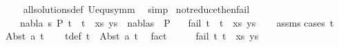 \begin{isabellebody}
\ \ \ \isamarkupfalse%
\ all{\isacharunderscore}{\kern0pt}solutions{\isacharunderscore}{\kern0pt}def\ U{\isacharunderscore}{\kern0pt}equ{\isacharunderscore}{\kern0pt}symm\ \isamarkupfalse%
\ simp\isanewline
{}\isamarkupfalse%
%
\endisatagproof
{\isafoldproof}%
%
\isadelimproof
\isanewline
%
\endisadelimproof
\isanewline
\isanewline
\isanewline
\isanewline
{}\isamarkupfalse%
\ not{\isacharunderscore}{\kern0pt}reduce{\isacharunderscore}{\kern0pt}then{\isacharunderscore}{\kern0pt}fail{\isacharcolon}{\kern0pt}\isanewline
\ \ \ {\isachardoublequoteopen}{\isasymnot}\ {\isacharparenleft}{\kern0pt}{\isasymexists}nabla\ s\ P{\isacharprime}{\kern0pt}{\isachardot}{\kern0pt}\ {\isacharparenleft}{\kern0pt}{\isacharparenleft}{\kern0pt}t{}\ {\isasymapprox}{\isacharquery}{\kern0pt}\ t{}{\isacharparenright}{\kern0pt}\ {\isacharhash}{\kern0pt}\ xs{\isacharcomma}{\kern0pt}\ ys{\isacharparenright}{\kern0pt}\ {\isasymTurnstile}\ {\isacharparenleft}{\kern0pt}nabla{\isacharcomma}{\kern0pt}s{\isacharparenright}{\kern0pt}\ {\isasymRightarrow}\ P{\isacharprime}{\kern0pt}{\isacharparenright}{\kern0pt}{\isachardoublequoteclose}\isanewline
\ \ \ {\isachardoublequoteopen}fail\ {\isacharparenleft}{\kern0pt}{\isacharparenleft}{\kern0pt}t{}\ {\isasymapprox}{\isacharquery}{\kern0pt}\ t{}{\isacharparenright}{\kern0pt}\ {\isacharhash}{\kern0pt}\ xs{\isacharcomma}{\kern0pt}\ ys{\isacharparenright}{\kern0pt}{\isachardoublequoteclose}\isanewline
%
\isadelimproof
\ \ %
\endisadelimproof
%
\isatagproof
{}\isamarkupfalse%
\ assms\isanewline
{}\isamarkupfalse%
{\isacharparenleft}{\kern0pt}cases\ t{}{\isacharparenright}{\kern0pt}\isanewline
\ \ \isamarkupfalse%
\ {\isacharparenleft}{\kern0pt}Abst\ a\ t{}{\isacharprime}{\kern0pt}{\isacharparenright}{\kern0pt}\isanewline
\ \ \isamarkupfalse%
\ t{}{\isacharunderscore}{\kern0pt}def{\isacharcolon}{\kern0pt}\ {\isachardoublequoteopen}t{}\ {\isacharequal}{\kern0pt}\ Abst\ a\ t{}{\isacharprime}{\kern0pt}{\isachardoublequoteclose}\ \isamarkupfalse%
\ fact\isanewline
\ \ \isamarkupfalse%
\ \isamarkupfalse%
\ {\isachardoublequoteopen}fail\ {\isacharparenleft}{\kern0pt}{\isacharparenleft}{\kern0pt}t{}{\isacharcomma}{\kern0pt}\ t{}{\isacharparenright}{\kern0pt}\ {\isacharhash}{\kern0pt}\ xs{\isacharcomma}{\kern0pt}\ ys{\isacharparenright}{\kern0pt}{\isachardoublequoteclose}\isanewline

\end{isabellebody}
